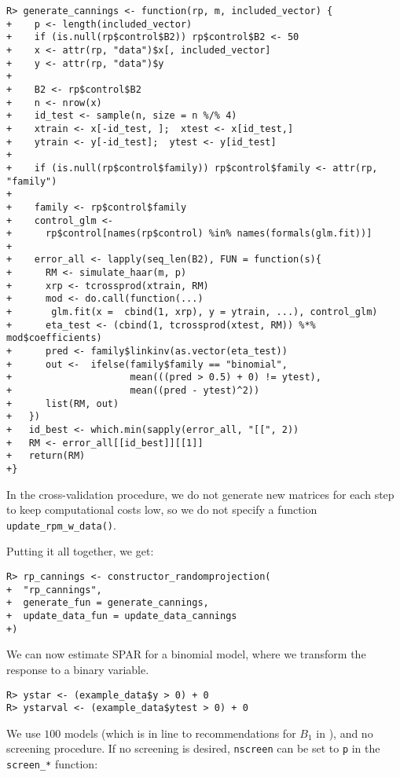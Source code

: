 \documentclass[
  article]{jss}
\begin{document}
\begin{verbatim}
R> generate_cannings <- function(rp, m, included_vector) {
+    p <- length(included_vector)
+    if (is.null(rp$control$B2)) rp$control$B2 <- 50
+    x <- attr(rp, "data")$x[, included_vector]
+    y <- attr(rp, "data")$y
+  
+    B2 <- rp$control$B2
+    n <- nrow(x)
+    id_test <- sample(n, size = n %/% 4)
+    xtrain <- x[-id_test, ];  xtest <- x[id_test,]
+    ytrain <- y[-id_test];  ytest <- y[id_test]
+  
+    if (is.null(rp$control$family)) rp$control$family <- attr(rp, "family")
+  
+    family <- rp$control$family
+    control_glm <-
+      rp$control[names(rp$control) %in% names(formals(glm.fit))]
+
+    error_all <- lapply(seq_len(B2), FUN = function(s){
+      RM <- simulate_haar(m, p)
+      xrp <- tcrossprod(xtrain, RM)
+      mod <- do.call(function(...) 
+       glm.fit(x =  cbind(1, xrp), y = ytrain, ...), control_glm)
+      eta_test <- (cbind(1, tcrossprod(xtest, RM)) %*% mod$coefficients)
+      pred <- family$linkinv(as.vector(eta_test))
+      out <-  ifelse(family$family == "binomial",
+                     mean(((pred > 0.5) + 0) != ytest), 
+                     mean((pred - ytest)^2))
+      list(RM, out)
+   })
+   id_best <- which.min(sapply(error_all, "[[", 2))
+   RM <- error_all[[id_best]][[1]]
+   return(RM)
+}
\end{verbatim}

In the cross-validation procedure, we do not generate new matrices for
each step to keep computational costs low, so we do not specify a
function \texttt{update\_rpm\_w\_data()}.

Putting it all together, we get:

\begin{verbatim}
R> rp_cannings <- constructor_randomprojection(
+  "rp_cannings",
+  generate_fun = generate_cannings,
+  update_data_fun = update_data_cannings
+)
\end{verbatim}

We can now estimate SPAR for a binomial model, where we transform the
response to a binary variable.

\begin{verbatim}
R> ystar <- (example_data$y > 0) + 0
R> ystarval <- (example_data$ytest > 0) + 0
\end{verbatim}

We use \(100\) models (which is in line to recommendations for \(B_1\)
in \citet{cannings2017random}), and no screening procedure. If no
screening is desired, \texttt{nscreen} can be set to \texttt{p} in the
\texttt{screen\_*} function:
\end{document}
